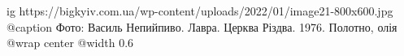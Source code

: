  
 
 
 
 

\ifcmt
  ig https://bigkyiv.com.ua/wp-content/uploads/2022/01/image21-800x600.jpg
  @caption Фото: Василь Непийпиво. Лавра. Церква Різдва. 1976. Полотно, олія
	@wrap center
	@width 0.6
\fi
